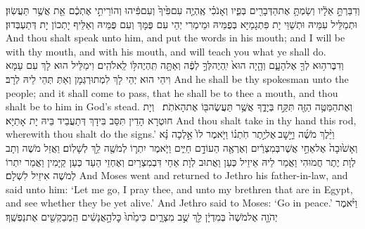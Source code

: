 {וְדִבַּרְתָּ֣ אֵלָ֔יו וְשַׂמְתָּ֥ אֶת\maqqaf הַדְּבָרִ֖ים בְּפִ֑יו וְאָנֹכִ֗י אֶֽהְיֶ֤ה עִם\maqqaf פִּ֙יךָ֙ וְעִם\maqqaf פִּ֔יהוּ וְהוֹרֵיתִ֣י אֶתְכֶ֔ם אֵ֖ת אֲשֶׁ֥ר תַּעֲשֽׂוּן׃}
{וּתְמַלֵּיל עִמֵּיהּ וּתְשַׁוֵּי יָת פִּתְגָמַיָּא בְּפֻמֵּיהּ וּמֵימְרִי יְהֵי עִם פֻּמָּךְ וְעִם פֻּמֵּיהּ וְאַלֵּיף יָתְכוֹן יָת דְּתַעְבְּדוּן׃}
{And thou shalt speak unto him, and put the words in his mouth; and I will be with thy mouth, and with his mouth, and will teach you what ye shall do.}{}
{וְדִבֶּר\maqqaf ה֥וּא לְךָ֖ אֶל\maqqaf הָעָ֑ם וְהָ֤יָה הוּא֙ יִֽהְיֶה\maqqaf לְּךָ֣ לְפֶ֔ה וְאַתָּ֖ה תִּֽהְיֶה\maqqaf לּ֥וֹ לֵֽאלֹהִֽים׃}
{וִימַלֵּיל הוּא לָךְ עִם עַמָּא וִיהֵי הוּא יְהֵי לָךְ לִמְתוּרְגְּמָן וְאַתְּ תְּהֵי לֵיהּ לְרָב׃}
{And he shall be thy spokesman unto the people; and it shall come to pass, that he shall be to thee a mouth, and thou shalt be to him in God’s stead.}{}
{וְאֶת\maqqaf הַמַּטֶּ֥ה הַזֶּ֖ה תִּקַּ֣ח בְּיָדֶ֑ךָ אֲשֶׁ֥ר תַּעֲשֶׂה\maqqaf בּ֖וֹ אֶת\maqqaf הָאֹתֹֽת׃ \petucha }
{וְיָת חוּטְרָא הָדֵין תִּסַּב בִּידָךְ דְּתַעֲבֵיד בֵּיהּ יָת אָתַיָּא׃}
{And thou shalt take in thy hand this rod, wherewith thou shalt do the signs.’}{}
{וַיֵּ֨לֶךְ מֹשֶׁ֜ה וַיָּ֣שׇׁב \legarmeh  אֶל\maqqaf יֶ֣תֶר חֹֽתְנ֗וֹ וַיֹּ֤אמֶר לוֹ֙ אֵ֣לְכָה נָּ֗א וְאָשׁ֙וּבָה֙ אֶל\maqqaf אַחַ֣י אֲשֶׁר\maqqaf בְּמִצְרַ֔יִם וְאֶרְאֶ֖ה הַעוֹדָ֣ם חַיִּ֑ים וַיֹּ֧אמֶר יִתְר֛וֹ לְמֹשֶׁ֖ה לֵ֥ךְ לְשָׁלֽוֹם׃}
{וַאֲזַל מֹשֶׁה וְתָב לְוָת יֶתֶר חֲמוּהִי וַאֲמַר לֵיהּ אֵיזֵיל כְּעַן וַאֲתוּב לְוָת אַחַי דִּבְמִצְרַיִם וְאֶחְזֵי הַעַד כְּעַן קַיָּמִין וַאֲמַר יִתְרוֹ לְמֹשֶׁה אִיזֵיל לִשְׁלָם׃}
{And Moses went and returned to Jethro his father-in-law, and said unto him: ‘Let me go, I pray thee, and unto my brethren that are in Egypt, and see whether they be yet alive.’ And Jethro said to Moses: ‘Go in peace.’}{}
{וַיֹּ֨אמֶר יְהֹוָ֤ה אֶל\maqqaf מֹשֶׁה֙ בְּמִדְיָ֔ן לֵ֖ךְ שֻׁ֣ב מִצְרָ֑יִם כִּי\maqqaf מֵ֙תוּ֙ כׇּל\maqqaf הָ֣אֲנָשִׁ֔ים הַֽמְבַקְשִׁ֖ים אֶת\maqqaf נַפְשֶֽׁךָ׃}

